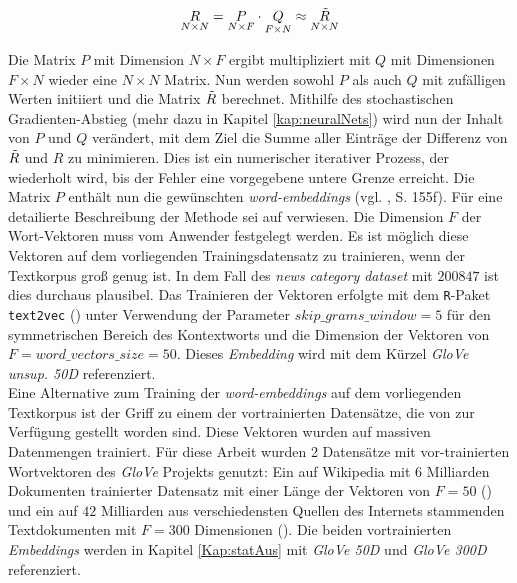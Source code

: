 \documentclass[a4paper,11pt]{article}
\begin{document}
\begin{equation*}
\underset{N \times N}{R} = \underset{N \times F}{P} \cdot \underset{F \times N}{Q} \approx  \underset{N \times N}{\Tilde{R}} 
\end{equation*}

Die Matrix $P$ mit Dimension $N \times F$ ergibt multipliziert mit $Q$ mit Dimensionen $F \times N$ wieder eine $N \times N$ Matrix. Nun werden sowohl $P$ als auch $Q$ mit zufälligen Werten initiiert und die Matrix $\Tilde{R}$ berechnet. Mithilfe des stochastischen Gradienten-Abstieg (mehr dazu in Kapitel \ref{kap:neuralNets}) wird nun der Inhalt von $P$ und $Q$ verändert, mit dem Ziel die Summe aller Einträge der Differenz von $\Tilde{R}$ und $R$ zu minimieren. Dies ist ein numerischer iterativer Prozess, der wiederholt wird, bis der Fehler eine vorgegebene untere Grenze erreicht. Die Matrix $P$ enthält nun die gewünschten \textit{word-embeddings} (vgl. \cite{keras}, S. 155f). Für eine detailierte Beschreibung der Methode sei auf \cite{glovePaper} verwiesen. Die Dimension $F$ der Wort-Vektoren muss vom Anwender festgelegt werden. Es ist möglich diese Vektoren auf dem vorliegenden Trainingsdatensatz zu trainieren, wenn der Textkorpus groß genug ist. In dem Fall des \textit{news category dataset} mit $200847$ ist dies durchaus plausibel. Das Trainieren der Vektoren erfolgte mit dem \texttt{R}-Paket \texttt{text2vec} (\cite{text2vec}) unter Verwendung der Parameter $skip\_grams\_window = 5$ für den symmetrischen Bereich des Kontextworts und die Dimension der Vektoren von $F = word\_vectors\_size = 50$. Dieses \textit{Embedding} wird mit dem Kürzel \textit{GloVe unsup. 50D} referenziert. \\
Eine Alternative zum Training der \textit{word-embeddings} auf dem vorliegenden Textkorpus ist der Griff zu einem der vortrainierten Datensätze, die von \cite{gloveOnline} zur Verfügung gestellt worden sind. Diese Vektoren wurden auf massiven Datenmengen trainiert. Für diese Arbeit wurden 2 Datensätze mit vor-trainierten Wortvektoren des \textit{GloVe} Projekts genutzt: Ein auf Wikipedia mit $6$ Milliarden Dokumenten trainierter Datensatz mit einer Länge der Vektoren von $F = 50$ (\cite{gloveWiki}) und ein auf $42$ Milliarden aus verschiedensten Quellen des Internets stammenden Textdokumenten mit $F = 300$ Dimensionen (\cite{gloveCommon}). Die beiden vortrainierten \textit{Embeddings} werden in Kapitel \ref{Kap:statAus} mit \textit{GloVe 50D} und \textit{GloVe 300D} referenziert.\\
\end{document}
